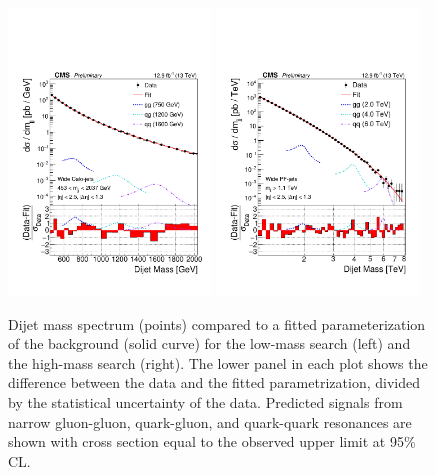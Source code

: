 \begin{figure}[hbtp]
  \begin{center}
    \includegraphics[width=0.48\textwidth]{figs/dijet/fit_mjj_Full_CaloDijet2016.pdf}
    \includegraphics[width=0.48\textwidth]{figs/dijet/fit_mjj_Full_PFDijet2016.pdf}
   \caption{
    Dijet mass spectrum (points) compared to a fitted
  parameterization of the background (solid curve) for the low-mass search (left) and 
  the high-mass search (right).
  The lower panel in each plot shows the difference between the data and the
  fitted parametrization, divided by the statistical uncertainty of the data. Predicted 
  signals from narrow gluon-gluon, quark-gluon, and quark-quark resonances are shown with cross section 
  equal to the observed upper limit at 95\% CL.}
    \label{figDataAndFit}
  \end{center}
\end{figure}


